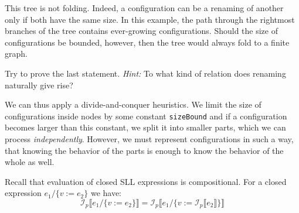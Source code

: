 This tree is not folding.
Indeed, a configuration can be a renaming of another only if both have the same size.
In this example, the path through the rightmost branches of the tree
contains ever-growing configurations.
Should the size of configurations be bounded, however, then the tree
would always fold to a finite graph.
\begin{exercise}
Try to prove the last statement. \textit{Hint:} To what kind of relation does
renaming naturally give rise?
\end{exercise}


We can thus apply a divide-and-conquer heuristics. 
We limit the size of configurations inside nodes by some constant \texttt{sizeBound}
and if a configuration becomes larger than this constant,
we split it into smaller parts, which we can process \emph{independently}.
However, we must
represent configurations in such a way, that knowing the behavior of the parts
is enough to know the behavior of the whole as well.

Recall that evaluation of closed SLL expressions is compositional.
For a closed expression $e_1 / \{v := e_2\}$ we have:
\[\mathcal{I}_p\llbracket e_1 / \{v := e_2\}\rrbracket = \mathcal{I}_p \llbracket e_1 / \{v := \mathcal{I}_p\llbracket e_2\rrbracket\} \rrbracket\]



%


